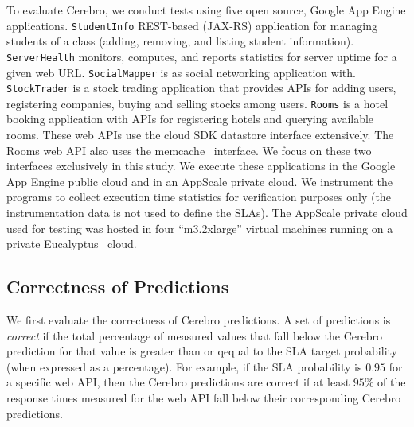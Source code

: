 To evaluate Cerebro, we conduct tests using five open source, Google
App Engine applications.
\texttt{StudentInfo} REST-based (JAX-RS) application for managing
students of a class (adding, removing, and listing student information).
\texttt{ServerHealth} monitors, computes, and reports statistics for server
uptime for a given web URL.  \texttt{SocialMapper} is as social networking
application with.  \texttt{StockTrader} is a stock trading application that
provides APIs for adding users, registering companies, buying and selling
stocks among users.  \texttt{Rooms} is a hotel booking application with APIs
for registering hotels and querying available rooms.  These web APIs use the
cloud SDK datastore interface extensively. The Rooms web API also uses the
memcache~\cite{XXXmemcacheXXX} 
interface. We focus on these two interfaces exclusively in this
study.  We execute these applications in the Google App Engine public cloud
and in an AppScale private cloud.  We instrument the programs to collect
execution time statistics for verification purposes only 
(the instrumentation data is not used to define
the SLAs).  The AppScale private cloud used for testing was
hosted in four ``m3.2xlarge'' virtual machines running on a private
Eucalyptus~\cite{eucalyptus09} cloud.



\subsection{Correctness of Predictions}
\label{sec:correctness}

We first evaluate the correctness of Cerebro predictions.  A set of
predictions is \textit{correct} if the total percentage of measured values that
fall below the Cerebro prediction for that value is greater than or qequal to
the SLA target probability (when expressed as a percentage). 
For example, if the SLA probability is $0.95$ for
a specific web API, then the Cerebro predictions are correct if at least
$95\%$ of the response times measured for the web API fall below their
corresponding Cerebro predictions. 

